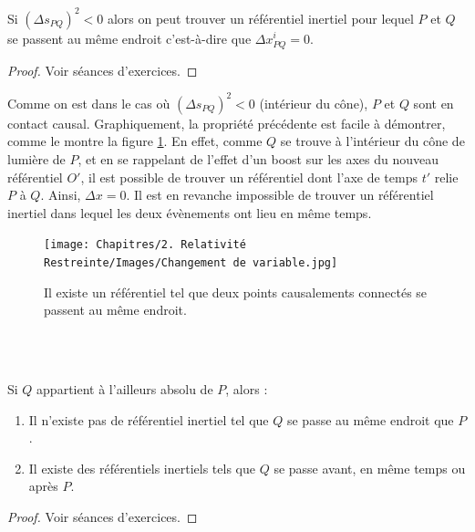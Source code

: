 {\begin{theoremframe}
    \begin{propri}
        Si $(\Delta s_{PQ})^2 < 0$ alors on peut trouver un référentiel inertiel pour lequel $P$ et $Q$ se passent au même endroit c'est-à-dire que $\Delta x^{i}_{PQ }= 0$.
    \end{propri}
\end{theoremframe}
\begin{proof}
    Voir séances d'exercices.
\end{proof}
    Comme on est dans le cas où $(\Delta s_{PQ})^2 < 0$ (intérieur du cône), $P$ et $Q$ sont en contact causal. Graphiquement, la propriété précédente est facile à démontrer, comme le montre la figure \ref{fig:2.2}. En effet, comme $Q$ se trouve à l'intérieur du cône de lumière de $P$, et en se rappelant de l'effet d'un boost sur les axes du nouveau référentiel $O'$, il est possible de trouver un référentiel dont l'axe de temps $t'$ relie $P$ à $Q$. Ainsi, $\Delta x = 0$. Il est en revanche impossible de trouver un référentiel inertiel dans lequel les deux évènements ont lieu en même temps.
\begin{figure}[H]
    \begin{center}
        \texttt{[image: Chapitres/2. Relativité Restreinte/Images/Changement de variable.jpg]}
        \caption{Il existe un référentiel tel que deux points causalements connectés se passent au même endroit.}
        \label{fig:2.2}
    \end{center}
\end{figure}
\quad\\
\\

\begin{theoremframe}
    \begin{propri}
        Si $Q$ appartient à l'ailleurs absolu de $P$, alors :
        \begin{enumerate}[label = \roman*.]
            \item Il n'existe pas de référentiel inertiel tel que $Q$ se passe au même endroit que $P$.
            \item Il existe des référentiels inertiels tels que $Q$ se passe avant, en même temps ou après $P$.
        \end{enumerate}
    \end{propri}
\end{theoremframe}
\begin{proof}
    Voir séances d'exercices.
\end{proof}

}
